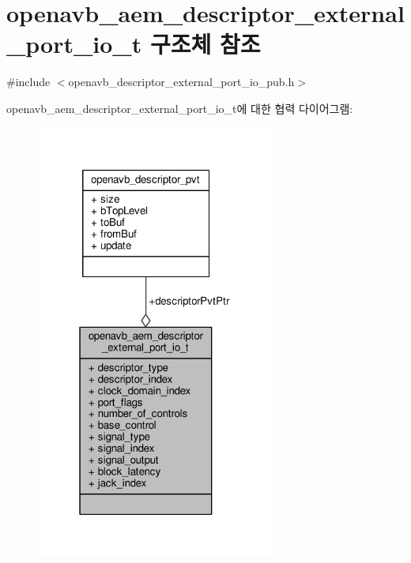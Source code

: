 \hypertarget{structopenavb__aem__descriptor__external__port__io__t}{}\section{openavb\+\_\+aem\+\_\+descriptor\+\_\+external\+\_\+port\+\_\+io\+\_\+t 구조체 참조}
\label{structopenavb__aem__descriptor__external__port__io__t}


{\ttfamily \#include $<$openavb\+\_\+descriptor\+\_\+external\+\_\+port\+\_\+io\+\_\+pub.\+h$>$}



openavb\+\_\+aem\+\_\+descriptor\+\_\+external\+\_\+port\+\_\+io\+\_\+t에 대한 협력 다이어그램\+:
\nopagebreak
\begin{figure}[H]
\begin{center}
\leavevmode
\includegraphics[width=223pt]{structopenavb__aem__descriptor__external__port__io__t__coll__graph}
\end{center}
\end{figure}
